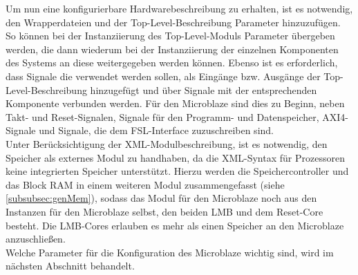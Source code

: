Um nun eine konfigurierbare Hardwarebeschreibung zu erhalten, ist es notwendig, den Wrapperdateien und der Top-Level-Beschreibung Parameter hinzuzufügen. So können bei der Instanziierung des Top-Level-Moduls Parameter übergeben werden, die dann wiederum bei der Instanziierung der einzelnen Komponenten des Systems an diese weitergegeben werden können. Ebenso ist es erforderlich, dass Signale die verwendet werden sollen, als Eingänge bzw. Ausgänge der Top-Level-Beschreibung hinzugefügt und über Signale mit der entsprechenden Komponente verbunden werden. Für den Microblaze sind dies zu Beginn, neben Takt- und Reset-Signalen, Signale für den Programm- und Datenspeicher, AXI4-Signale und Signale, die dem FSL-Interface zuzuschreiben sind.\\
Unter Berücksichtigung der XML-Modulbeschreibung, ist es notwendig, den Speicher als externes Modul zu handhaben, da die XML-Syntax für Prozessoren keine integrierten Speicher unterstützt. Hierzu werden die Speichercontroller und das Block RAM in einem weiteren Modul zusammengefasst (siehe \ref{subsubsec:genMem}), sodass das Modul für den Microblaze noch aus den Instanzen für den Microblaze selbst, den beiden LMB und dem Reset-Core besteht. Die LMB-Cores erlauben es mehr als einen Speicher an den Microblaze anzuschließen.\\
Welche Parameter für die Konfiguration des Microblaze wichtig sind, wird im nächsten Abschnitt behandelt. 
